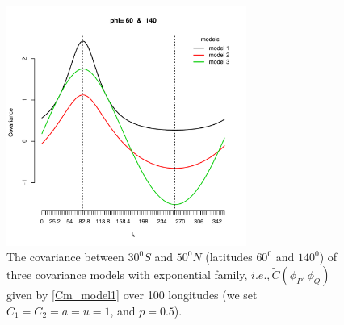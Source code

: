 			\begin{figure}[H]
				\centering
				\includegraphics[width=0.7\textwidth]{graphs/all_covariance_models}
				\caption[The Covariance Between $30^0S$ and $50^0N$ (Latitudes $60^0$ and $140^0$) of Three] {The covariance between $30^0S$ and $50^0N$ (latitudes $60^0$ and $140^0$) of three covariance models with exponential family, $ i.e., \tilde{C}(\phi_P, \phi_Q)$ given by \eqref{Cm_model1} over 100 longitudes (we set $C_1 = C_2 = a = u = 1$, and $p = 0.5$).}
			\end{figure}
				
					
